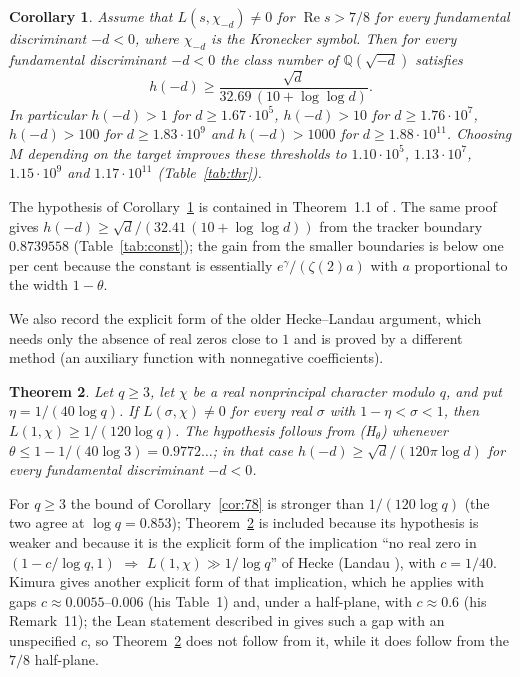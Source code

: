 \documentclass[11pt]{article}
\newtheorem{theorem}{Theorem}[section]
\newtheorem{corollary}[theorem]{Corollary}
\theoremstyle{definition}
\theoremstyle{remark}
\numberwithin{equation}{section}
\newcommand{\Q}{\mathbb Q}
\newcommand{\Rea}{\operatorname{Re}}
\begin{document}
\begin{corollary}\label{cor:class}
Assume that $L(s,\chi_{-d})\ne0$ for $\Rea s>7/8$ for every fundamental discriminant $-d<0$, where $\chi_{-d}$ is the Kronecker symbol. Then for every fundamental discriminant $-d<0$ the class number of $\Q(\sqrt{-d})$ satisfies
\[
 h(-d)\ge\frac{\sqrt d}{32.69\,(10+\log\log d)} .
\]
In particular $h(-d)>1$ for $d\ge1.67\cdot10^{5}$, $h(-d)>10$ for $d\ge1.76\cdot10^{7}$, $h(-d)>100$ for $d\ge1.83\cdot10^{9}$ and $h(-d)>1000$ for $d\ge1.88\cdot10^{11}$. Choosing $M$ depending on the target improves these thresholds to $1.10\cdot10^{5}$, $1.13\cdot10^{7}$, $1.15\cdot10^{9}$ and $1.17\cdot10^{11}$ (Table~\ref{tab:thr}).
\end{corollary}

The hypothesis of Corollary~\ref{cor:class} is contained in Theorem~1.1 of \cite{openai2026q}. The same proof gives $h(-d)\ge\sqrt d/(32.41\,(10+\log\log d))$ from the tracker boundary $0.8739558$ (Table~\ref{tab:const}); the gain from the smaller boundaries is below one per cent because the constant is essentially $e^{\gamma}/(\zeta(2)a)$ with $a$ proportional to the width $1-\theta$.

We also record the explicit form of the older Hecke--Landau argument, which needs only the absence of real zeros close to $1$ and is proved by a different method (an auxiliary function with nonnegative coefficients).

\begin{theorem}\label{thm:HL}
Let $q\ge3$, let $\chi$ be a real nonprincipal character modulo $q$, and put $\eta=1/(40\log q)$. If $L(\sigma,\chi)\ne0$ for every real $\sigma$ with $1-\eta<\sigma<1$, then $L(1,\chi)\ge1/(120\log q)$. The hypothesis follows from \textup{(H$_\theta$)} whenever $\theta\le1-1/(40\log 3)=0.9772\ldots$; in that case $h(-d)\ge\sqrt d/(120\pi\log d)$ for every fundamental discriminant $-d<0$.
\end{theorem}

For $q\ge3$ the bound of Corollary~\ref{cor:78} is stronger than $1/(120\log q)$ (the two agree at $\log q=0.853$); Theorem~\ref{thm:HL} is included because its hypothesis is weaker and because it is the explicit form of the implication ``no real zero in $(1-c/\log q,1)$ $\Rightarrow$ $L(1,\chi)\gg1/\log q$'' of Hecke (Landau \cite{landau1918}), with $c=1/40$. Kimura \cite[Lemma~8, Proposition~9]{kimura2026} gives another explicit form of that implication, which he applies with gaps $c\approx0.0055$--$0.006$ (his Table~1) and, under a half-plane, with $c\approx0.6$ (his Remark~11); the Lean statement described in \cite{openai2026lean} gives such a gap with an unspecified $c$, so Theorem~\ref{thm:HL} does not follow from it, while it does follow from the $7/8$ half-plane.
\end{document}
